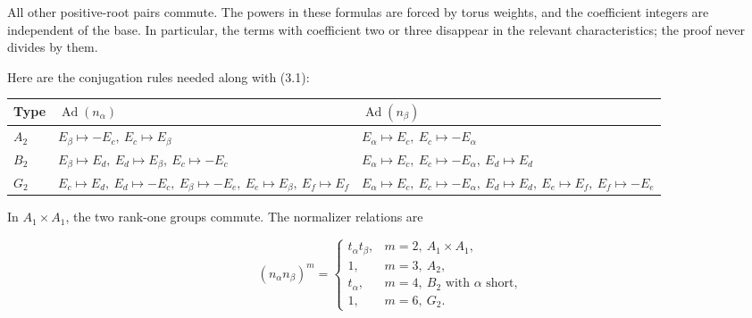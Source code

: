 \documentclass[11pt,a4paper,openany]{report}
\newcounter{none}
\begin{document}
All other positive-root pairs commute. The powers in these formulas are forced by torus weights, and the coefficient integers are independent of the base. In particular, the terms with coefficient two or three disappear in the relevant characteristics; the proof never divides by them.

Here are the conjugation rules needed along with (3.1):

{\def\LTcaptype{none} %
\begin{longtable}[]{@{}
  >{\raggedright\arraybackslash}p{}
  >{\raggedright\arraybackslash}p{}
  >{\raggedright\arraybackslash}p{}@{}}
\toprule\noalign{}
\begin{minipage}[b]{\linewidth}\raggedright
Type
\end{minipage} & \begin{minipage}[b]{\linewidth}\raggedright
\(\operatorname{Ad}(n_\alpha)\)
\end{minipage} & \begin{minipage}[b]{\linewidth}\raggedright
\(\operatorname{Ad}(n_\beta)\)
\end{minipage} \\
\midrule\noalign{}
\endhead
\bottomrule\noalign{}
\endlastfoot
\(A_2\) & \(E_\beta\mapsto-E_c,\ E_c\mapsto E_\beta\) & \(E_\alpha\mapsto E_c,\ E_c\mapsto-E_\alpha\) \\
\(B_2\) & \(E_\beta\mapsto E_d,\ E_d\mapsto E_\beta,\ E_c\mapsto-E_c\) & \(E_\alpha\mapsto E_c,\ E_c\mapsto-E_\alpha,\ E_d\mapsto E_d\) \\
\(G_2\) & \(E_c\mapsto E_d,\ E_d\mapsto-E_c,\ E_\beta\mapsto-E_e,\ E_e\mapsto E_\beta,\ E_f\mapsto E_f\) & \(E_\alpha\mapsto E_c,\ E_c\mapsto-E_\alpha,\ E_d\mapsto E_d,\ E_e\mapsto E_f,\ E_f\mapsto-E_e\) \\
\end{longtable}
}

In \(A_1\times A_1\), the two rank-one groups commute. The normalizer relations are

\[
(n_\alpha n_\beta)^m=
\begin{cases}
t_\alpha t_\beta,&m=2,\ A_1\times A_1,\\
1,&m=3,\ A_2,\\
t_\alpha,&m=4,\ B_2\text{ with }\alpha\text{ short},\\
1,&m=6,\ G_2.
\end{cases}
\tag{3.2}
\]
\end{document}
